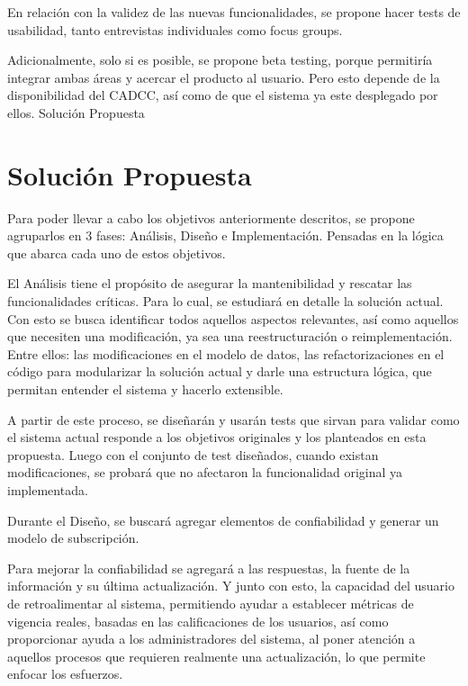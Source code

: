     \par En relación con la validez de las nuevas funcionalidades, se propone hacer tests de usabilidad, tanto entrevistas individuales como focus groups.
    
    \par Adicionalmente, solo si es posible, se propone beta testing, porque permitiría integrar ambas áreas y acercar el producto al usuario. Pero esto depende de la disponibilidad del CADCC, así como de que el sistema ya este desplegado por ellos.
Solución Propuesta

\section{Solución Propuesta}\label{sec:intro-sol}
    \par Para poder llevar a cabo los objetivos anteriormente descritos, se propone agruparlos en 3 fases: Análisis, Diseño e Implementación. Pensadas en la lógica que abarca cada uno de estos objetivos.
    
    \par El Análisis tiene el propósito de asegurar la mantenibilidad y rescatar las funcionalidades críticas. Para lo cual, se estudiará en detalle la solución actual. Con esto se busca identificar todos aquellos aspectos relevantes, así como aquellos que necesiten una modificación, ya sea una reestructuración o reimplementación. Entre ellos: las modificaciones en el modelo de datos, las refactorizaciones en el código para modularizar la solución actual y darle una estructura lógica, que permitan entender el sistema y hacerlo extensible.
    
    \par A partir de este proceso, se diseñarán y usarán tests que sirvan para validar como el sistema actual responde a los objetivos originales y los planteados en esta propuesta. Luego con el conjunto de test diseñados, cuando existan modificaciones, se probará que no afectaron la funcionalidad original ya implementada.
    
    \par Durante el Diseño,  se buscará agregar elementos de confiabilidad y generar un modelo de subscripción.
    \par Para mejorar la confiabilidad se agregará a las respuestas, la fuente de la información y su última actualización. Y junto con esto, la capacidad del usuario de retroalimentar al sistema, permitiendo ayudar a establecer métricas de vigencia reales, basadas en las calificaciones de los usuarios, así como proporcionar ayuda a los administradores del sistema, al poner atención a aquellos procesos que requieren realmente una actualización, lo que permite enfocar los esfuerzos.
    
